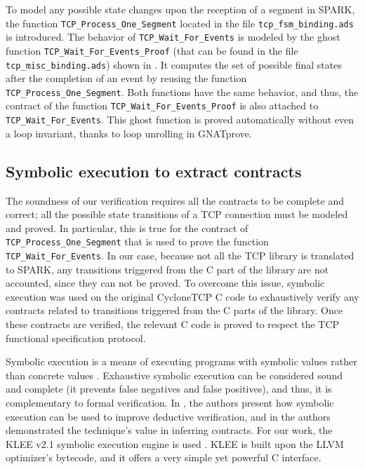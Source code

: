 \documentclass[conference]{IEEEtran}
\def\spark#1{\lstinline[language=Ada]{#1}}
\begin{document}
To model any possible state changes upon the reception of a segment in SPARK, the function \spark{TCP_Process_One_Segment} located in the file \texttt{tcp\_fsm\_binding.ads} is introduced.
The behavior of \spark{TCP_Wait_For_Events} is modeled by the ghost function \spark{TCP_Wait_For_Events_Proof} (that can be found in the file \texttt{tcp\_misc\_binding.ads}) shown in . It computes the set of possible final states after the completion of an event by reusing the function \spark{TCP_Process_One_Segment}. Both functions have the same behavior, and thus, the contract of the function \spark{TCP_Wait_For_Events_Proof} is also attached to \spark{TCP_Wait_For_Events}. This ghost function is proved automatically without even a loop invariant, thanks to loop unrolling in GNATprove.


\subsection{Symbolic execution to extract contracts}

The soundness of our verification requires all the contracts to be complete and correct; all the possible state transitions of a TCP connection must be modeled and proved.  In particular, this is true for the contract of \spark{TCP_Process_One_Segment} that is used to prove the function \spark{TCP_Wait_For_Events}. In our case, because not all the TCP library is translated to SPARK, any transitions triggered from the C part of the library are not accounted, since they can not be proved. To overcome this issue, symbolic execution was used on the original CycloneTCP C code to exhaustively verify any contracts related to transitions triggered from the C parts of the library. Once these contracts are verified, the relevant C code is proved to respect the TCP functional specification protocol.

Symbolic execution is a means of executing programs with symbolic values rather than concrete values \cite{symbolic_exec_survey:2018}. Exhaustive symbolic execution can be considered sound and complete (it prevents false negatives and false positives), and thus, it is complementary to formal verification. In \cite{vanoverberghe2008using}, the authors present how symbolic execution can be used to improve deductive verification, and in \cite{kassios2012comparing} the authors demonstrated the technique's value in inferring contracts. For our work, the KLEE v2.1 symbolic execution engine is used \cite{KLEE}. KLEE is built upon the LLVM optimizer's bytecode, and it offers a very simple yet powerful C interface.
\end{document}
